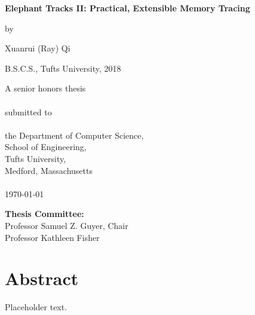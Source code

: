 \documentclass[12pt]{report}
\begin{document}
    
    
\begin{titlepage}
\begin{center}        
\LARGE
\textbf{Elephant Tracks II: Practical, Extensible Memory Tracing}
        
\vspace{0.5in}
\large
by
\vspace{0.5in}

\Large
Xuanrui (Ray) Qi

\vspace{0.25in}

\normalsize
B.S.C.S., Tufts University, 2018

\vspace{1in}

\normalsize
A senior honors thesis\\~\\
submitted to\\~\\
the Department of Computer Science,\\
School of Engineering,\\
Tufts University,\\
Medford, Massachusetts\\~\\
\today

\vspace{0.75in}

\normalsize
\textbf{Thesis Committee:}\\
Professor Samuel Z. Guyer, Chair\\
Professor Kathleen Fisher
        
\end{center}
\end{titlepage}

\newpage
\section*{\centering Abstract}
\begin{center}
  Placeholder text.
\end{center}
\thispagestyle{empty}

\newpage

\setcounter{tocdepth}{0}
\tableofcontents
\thispagestyle{empty}
\end{document}
